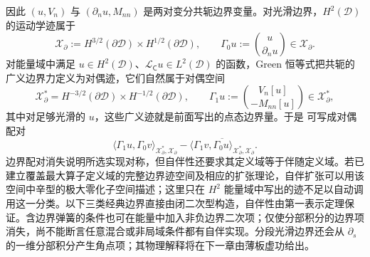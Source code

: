 因此 \((u,V_n)\) 与 \((\partial_nu,M_{nn})\) 是两对变分共轭边界变量。对光滑边界，\(H^2(\mathcal D)\) 的运动学迹属于
\[
 \mathscr X_{\partial}:=H^{3/2}(\partial\mathcal D)\times H^{1/2}(\partial\mathcal D),
 \qquad
 \Gamma_0u:=\binom{u}{\partial_nu}\in\mathscr X_{\partial}.
\]
对能量域中满足 \(u\in H^2(\mathcal D)\)、\(\mathcal L_{\mathsf C}u\in L^2(\mathcal D)\) 的函数，Green 恒等式把共轭的广义边界力定义为对偶迹，它们自然属于对偶空间
\[
 \mathscr X_{\partial}^{*}
 =H^{-3/2}(\partial\mathcal D)\times H^{-1/2}(\partial\mathcal D),
 \qquad
 \Gamma_1u:=\binom{V_n[u]}{-M_{nn}[u]}\in\mathscr X_{\partial}^{*},
\]
其中对足够光滑的 \(u\)，这些广义迹就是前面写出的点态边界量。于是 可写成对偶配对
\[
 \langle\Gamma_1u,\Gamma_0v\rangle_{\mathscr X_{\partial}^{*},\mathscr X_{\partial}}
 -\overline{\langle\Gamma_1v,\Gamma_0u\rangle_{\mathscr X_{\partial}^{*},\mathscr X_{\partial}}}.
\]
边界配对消失说明所选实现对称，但自伴性还要求其定义域等于伴随定义域。若已建立覆盖最大算子定义域的完整边界迹空间及相应的扩张理论，自伴扩张可以用该空间中辛型的极大零化子空间描述；这里只在 $H^2$ 能量域中写出的迹不足以自动调用这一分类。以下三类经典边界直接由闭二次型构造，自伴性由第一表示定理保证。含边界弹簧的条件也可在能量中加入非负边界二次项；仅使分部积分的边界项消失，尚不能断言任意混合或非局域条件都有自伴实现。分段光滑边界还会从 \(\partial_s\) 的一维分部积分产生角点项；其物理解释将在下一章由薄板虚功给出。

